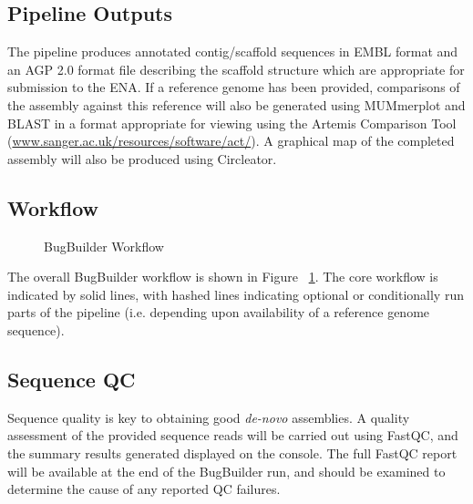 \documentclass[a4paper,10pt]{article}
\begin{document}
\subsection{Pipeline Outputs}

The pipeline produces annotated contig/scaffold sequences in EMBL format and an
AGP 2.0 format file describing the scaffold structure which are appropriate
for submission to the ENA. If a reference genome has been provided, comparisons
of the assembly against this reference will also be generated using MUMmerplot
and BLAST in a format appropriate for viewing using the Artemis Comparison Tool
(\url{www.sanger.ac.uk/resources/software/act/}). A graphical map of the
completed assembly will also be produced using Circleator. 

\subsection{Workflow}

\begin{figure}[ht] 
\caption{BugBuilder Workflow} \label{fig:BugBuilderWorkflow} \end{figure}

The overall BugBuilder workflow is shown in Figure
~\ref{fig:BugBuilderWorkflow}. The core workflow is indicated by solid lines,
with hashed lines indicating optional or conditionally run parts of the
pipeline (i.e. depending upon availability of a reference genome sequence). 

\subsection{Sequence QC}

Sequence quality is key to obtaining good \textit{de-novo} assemblies. A
quality assessment of the provided sequence reads will be carried out using
FastQC, and the summary results generated displayed on the console. The full
FastQC report will be available at the end of the BugBuilder run, and should be
examined to determine the cause of any reported QC failures. 
\end{document}
